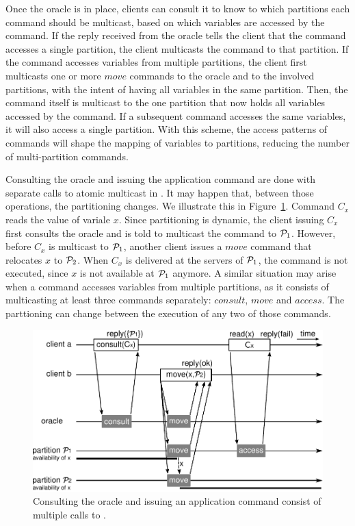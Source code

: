 
Once the oracle is in place, clients can consult it to know to which partitions each command should be multicast, based on which variables are accessed by the command.
If the reply received from the oracle tells the client that the command accesses a single partition, the client multicasts the command to that partition.
If the command accesses variables from multiple partitions, the client first multicasts one or more $move$ commands to the oracle and to the involved partitions, with the intent of having all variables in the same partition.
Then, the command itself is multicast to the one partition that now holds all variables accessed by the command.
If a subsequent command accesses the same variables, it will also access a single partition.
With this scheme, the access patterns of commands will shape the mapping of variables to partitions, reducing the number of multi-partition commands.

Consulting the oracle and issuing the application command are done with separate calls to atomic multicast in \dssmr{}.
It may happen that, between those operations, the partitioning changes.
We illustrate this in Figure~\ref{fig:move_case_1}.
Command $C_x$ reads the value of variale $x$.
Since partitioning is dynamic, the client issuing $C_x$ first consults the oracle and is told to multicast the command to $\mathcal{P}_1$.
However, before $C_x$ is multicast to $\mathcal{P}_1$, another client issues a $move$ command that relocates $x$ to $\mathcal{P}_2$.
When $C_x$ is delivered at the servers of $\mathcal{P}_1$, the command is not executed, since $x$ is not available at $\mathcal{P}_1$ anymore.
A similar situation may arise when a command accesses variables from multiple partitions, as it consists of multicasting at least three commands separately: $consult$, $move$ and $access$.
The parttioning can change between the execution of any two of those commands.

\begin{figure}[b!]
  \includegraphics[width=\linewidth]{figures/move_case_1}
  \caption{Consulting the oracle and issuing an application command consist of multiple calls to \amcast{}.}
  \label{fig:move_case_1}
\end{figure}

